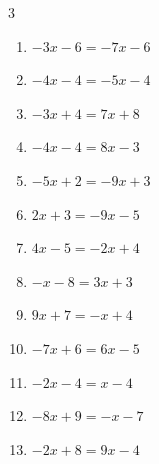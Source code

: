 \begin{multicols}{3}
\begin{enumerate}
        \phantom{$\displaystyle x=-7$}

  \item $-3x-6=-7x-6$

        \phantom{$\displaystyle x=0$}

  \item $-4x-4=-5x-4$

        \phantom{$\displaystyle x=0$}

  \item $-3x+4=7x+8$


  \item $-4x-4=8x-3$


  \item $-5x+2=-9x+3$


  \item $2x+3=-9x-5$


  \item $4x-5=-2x+4$


  \item $-x-8=3x+3$


\columnbreak %

  \item $9x+7=-x+4$


  \item $-7x+6=6x-5$


  \item $-2x-4=x-4$

        \phantom{$\displaystyle x=0$}

  \item $-8x+9=-x-7$


  \item $-2x+8=9x-4$



\end{enumerate}
\end{multicols}
